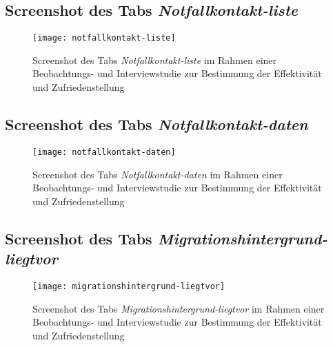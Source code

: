 \begin{landscape}
    \subsection{Screenshot des Tabs \textit{Notfallkontakt-liste}}
    \label{section-notfallkontakt-liste}
    \begin{figure}[H]
        \centering
        \caption{Screenshot des Tabs \textit{Notfallkontakt-liste} im Rahmen einer Beobachtungs- und Interviewstudie zur Bestimmung der Effektivität und Zufriedenstellung}
        \begin{adjustbox}{width=\linewidth, center}
            \texttt{[image: notfallkontakt-liste]}
        \end{adjustbox}
    \end{figure}

    \subsection{Screenshot des Tabs \textit{Notfallkontakt-daten}}
    \label{section-notfallkontakt-daten}
    \begin{figure}[H]
        \centering
        \caption{Screenshot des Tabs \textit{Notfallkontakt-daten} im Rahmen einer Beobachtungs- und Interviewstudie zur Bestimmung der Effektivität und Zufriedenstellung}
        \begin{adjustbox}{width=0.6\linewidth, center}
            \texttt{[image: notfallkontakt-daten]}
        \end{adjustbox}
    \end{figure}

    \subsection{Screenshot des Tabs \textit{Migrationshintergrund-liegtvor}}
    \label{section-migrationshintergrund-liegtvor}
    \begin{figure}[H]
        \centering
        \caption{Screenshot des Tabs \textit{Migrationshintergrund-liegtvor} im Rahmen einer Beobachtungs- und Interviewstudie zur Bestimmung der Effektivität und Zufriedenstellung}
        \begin{adjustbox}{width=\linewidth, center}
            \texttt{[image: migrationshintergrund-liegtvor]}
        \end{adjustbox}
    \end{figure}


\end{landscape}

